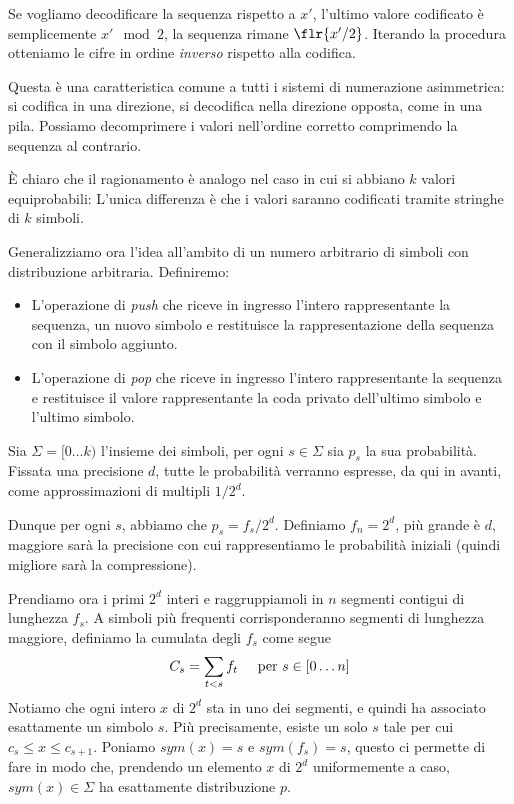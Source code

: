 Se vogliamo decodificare la sequenza rispetto a $x'$, l'ultimo valore codificato è semplicemente $x' \mod 2$, la sequenza rimane $\flr{x'/2}$. Iterando la procedura otteniamo le cifre in ordine \textit{inverso} rispetto alla codifica.

Questa è una caratteristica comune a tutti i sistemi di numerazione asimmetrica: si codifica in una direzione, si decodifica nella direzione opposta, come in una pila. Possiamo decomprimere i valori nell'ordine corretto comprimendo la sequenza al contrario.

È chiaro che il ragionamento è analogo nel caso in cui si abbiano $k$ valori equiprobabili: L'unica differenza è che i valori saranno codificati tramite stringhe di $k$ simboli.

Generalizziamo ora l'idea all'ambito di un numero arbitrario di simboli con distribuzione arbitraria. Definiremo:
\begin{itemize}
	\item L'operazione di \textit{push} che riceve in ingresso l'intero rappresentante la sequenza, un nuovo simbolo e restituisce la rappresentazione della sequenza con il simbolo aggiunto.
	\item L'operazione di \textit{pop} che riceve in ingresso l'intero rappresentante la sequenza e restituisce il valore rappresentante la coda privato dell'ultimo simbolo e l'ultimo simbolo.
\end{itemize}
Sia $\Sigma = [0 \dots k)$ l'insieme dei simboli, per ogni $s \in \Sigma$ sia $p_s$ la sua probabilità. Fissata una precisione $d$, tutte le probabilità verranno espresse, da qui in avanti, come approssimazioni di multipli $1/2^d$.

Dunque per ogni $s$, abbiamo che $p_s = f_s / 2^d$. Definiamo $f_n = 2^d$, più grande è $d$, maggiore sarà la precisione con cui rappresentiamo le probabilità iniziali (quindi migliore sarà la compressione).

Prendiamo ora i primi $2^d$ interi e raggruppiamoli in $n$ segmenti contigui di lunghezza $f_s$. A simboli più frequenti corrisponderanno segmenti di lunghezza maggiore, definiamo la cumulata degli $f_s$ come segue
\begin{equation}
	C_s = \sum_{t < s}f_t \hspace{5mm} \textnormal{per $s$} \in [0 \dots n]
\end{equation}
Notiamo che ogni intero $x$ di $2^d$ sta in uno dei segmenti, e quindi ha associato esattamente un simbolo $s$. Più precisamente, esiste un solo $s$ tale per cui $c_s \leq x \leq c_{s + 1}$. Poniamo $sym(x) = s$ e $sym(f_s) = s$, questo ci permette di fare in modo che, prendendo un elemento $x$ di $2^d$ uniformemente a caso, $sym(x) \in \Sigma$ ha esattamente distribuzione $p$.

